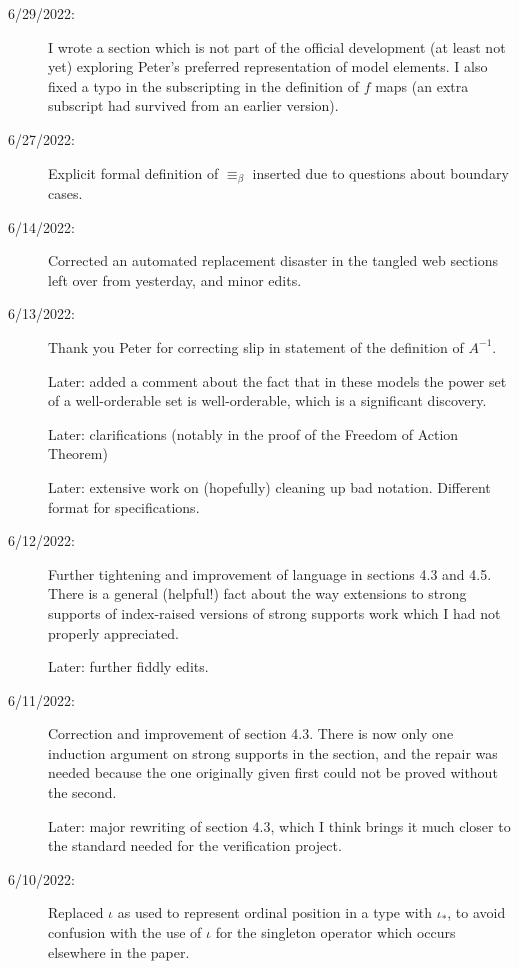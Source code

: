 \documentclass[112pt]{article}
\begin{document}
\begin{description}

\item[6/29/2022:]  I wrote a section which is not part of the official development (at least not yet) exploring Peter's preferred representation of model elements.  I also fixed a typo in the subscripting in the definition of $f$ maps (an extra subscript had survived from an earlier version).

\item[6/27/2022:]  Explicit formal definition of $\equiv_\beta$ inserted due to questions about boundary cases.

\item[6/14/2022:]  Corrected an automated replacement disaster in the tangled web sections left over from yesterday, and minor edits.

\item[6/13/2022:]  Thank you Peter for correcting slip in statement of the definition of $A^{-1}$.

Later:  added a comment about the fact that in these models the power set of a well-orderable set is well-orderable, which is a significant discovery.

Later:  clarifications (notably in the proof of the Freedom of Action Theorem) 

Later:  extensive work on (hopefully) cleaning up bad notation.  Different format for specifications.

\item[6/12/2022:]  Further tightening and improvement of language in sections 4.3 and 4.5.  There is a general (helpful!) fact about the way extensions to strong supports of index-raised versions of strong supports work which I had not properly appreciated.

Later: further fiddly edits.

\item[6/11/2022:]  Correction and improvement of section 4.3.  There is now only one induction argument on strong supports in the section, and the repair was needed because the one originally given first could not be proved without the second.

Later:  major rewriting of section 4.3, which I think brings it much closer to the standard needed for the verification project.

\item[6/10/2022:]  Replaced $\iota$ as used to represent ordinal position in a type with $\iota_*$, to avoid confusion with the use of $\iota$ for the singleton operator which occurs elsewhere in the paper.


\end{description}
\end{document}
